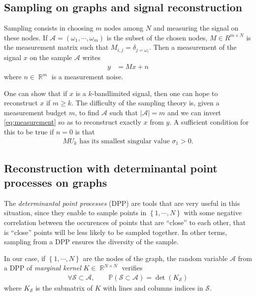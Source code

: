 \documentclass{article}
\newcommand{\abs} [1] {\left| #1 \right|}
\DeclareMathOperator{\R}{\mathbb{R}}
\begin{document}
\subsection{Sampling on graphs and signal reconstruction}


Sampling consists in choosing $m$ nodes among $N$ and measuring the signal on these nodes. If $\mathcal{A} = (\omega_1, \cdots, \omega_m)$ is the subset of the chosen nodes, $M \in R^{m \times N}$ is the measurement matrix such that $M_{i, j} = \delta_{j = \omega_i}$. Then a measurement of the signal $x$ on the sample $\mathcal{A}$ writes
\begin{align} y &= M x + n \label{eq:measurement}\end{align}
where $n \in \R^m$ is a measurement noise.


One can show that if $x$ is a $k$-bandlimited signal, then one can hope to reconstruct $x$ if $m \geq k$. The difficulty of the sampling theory is, given a measurement budget $m$, to find $\mathcal{A}$ such that $\abs{\mathcal{A}} = m$ and we can invert \eqref{eq:measurement} so as to reconstruct exactly $x$ from $y$. A sufficient condition for this to be true if $n = 0$ is that 
\begin{align} \text{$MU_k$ has its smallest singular value $\sigma_1 > 0$.} \label{eq:sufficientconditionreconstruction}\end{align}


\subsection{Reconstruction with determinantal point processes on graphs}


The \emph{determinantal point processes} (DPP) \cite{kuelsza2012} are tools that are very useful in this situation, since they enable to sample points in $\left\{ 1, \cdots, N\right\}$ with some negative correlation between the occurences of points that are ``close'' to each other, that is ``close'' points will be less likely to be sampled together. In other terms, sampling from a DPP ensures the diversity of the sample.


In our case, if $\left\{ 1, \cdots, N\right\}$ are the nodes of the graph, the random variable $\mathcal{A}$ from a DPP of \emph{marginal kernel} $K \in \R^{N \times N}$ verifies
\begin{align} \forall \mathcal{S} \subset \mathcal{A}, \qquad \mathbb{P}(\mathcal{S} \subset \mathcal{A}) = \det(K_\mathcal{S}) \label{eq:defDPP}\end{align}
where $K_\mathcal{S}$ is the submatrix of $K$ with lines and columns indices in $\mathcal{S}$.
\end{document}
